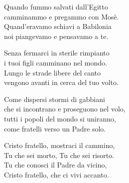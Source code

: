 

\spazio

\strofa Quando fummo salvati dall'Egitto\\
camminammo e pregammo con Mosè.\\
Quand'eravamo schiavi a Babilonia\\
noi piangevamo e pensavamo a te.

\spazio


\spazio

\strofa Senza fermarci in sterile rimpianto\\
i tuoi figli camminano nel mondo.\\
Lungo le strade libere del canto\\
vengono avanti in cerca del tuo volto.

\spazio


\spazio

\strofa Come dispersi stormi di gabbiani\\
che si incontrano e proseguono nel volo,\\
tutti i popoli del mondo si uniranno,\\
come fratelli verso un Padre solo.

\spazio


\spazio

\strofa Cristo fratello, mostraci il cammino,\\
Tu che sei morto, Tu che sei risorto.\\
Tu che conosci il Padre da vicino,\\
Cristo fratello, che ci vivi accanto.

\spazio

